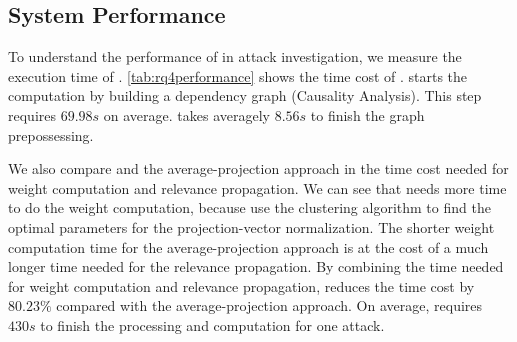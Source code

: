 %




\subsection{System Performance}

To understand the performance of \tool in attack investigation, we measure the execution time of \tool. \cref{tab:rq4performance} shows the time cost of \tool. 
\tool starts the computation by building a dependency graph (\ie Causality Analysis). This step requires $69.98s$ on average. 
\tool takes averagely $8.56s$ to finish the graph prepossessing. 

We also compare \tool and the average-projection approach in the time cost needed for weight computation and relevance propagation. 
We can see that \tool needs more time to do the weight computation, because \tool use the clustering algorithm to find the optimal parameters for the projection-vector normalization. 
The shorter weight computation time for the average-projection approach is at the cost of a much longer time needed for the relevance propagation. 
By combining the time needed for weight computation and relevance propagation, \tool reduces the time cost by $80.23\%$ compared with the average-projection approach. 
On average, \tool requires $430s$ to finish the processing and computation for one attack.
